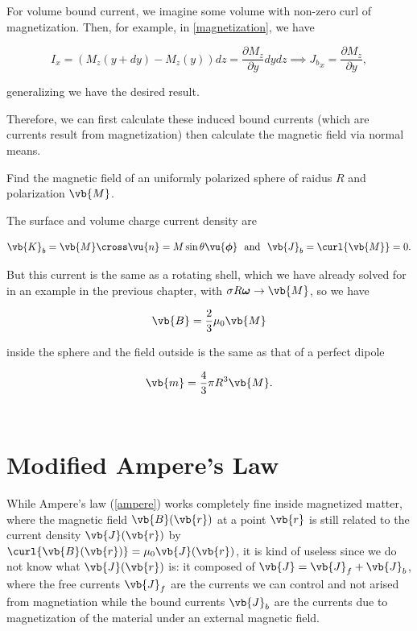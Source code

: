 \documentclass[english,a4paper,12pt]{report}
\begin{document}
For volume bound current, we imagine some volume with non-zero curl of magnetization. Then, for example, in \cref{magnetization}, we have

\begin{equation}
    I_{x} = (M_{z}(y+dy) - M_{z}(y) )dz = \frac{\partial M_{z} }{\partial y}dydz \implies {J_{b}}_{x} = \frac{\partial M_{z} }{\partial y},     
\end{equation}

generalizing we have the desired result.


Therefore, we can first calculate these induced bound currents (which are currents result from magnetization) then calculate the magnetic field via normal means.

{Find the magnetic field of an uniformly polarized sphere of raidus \(R\) and polarization \(\vb{M} \).}
{The surface and volume charge current density are 

\begin{equation}
    \vb{K} _{b} = \vb{M} \cross \vu{n} = M\sin \theta \vu{\boldsymbol{\phi } } ~\text { and }~  \vb{J} _{b} = \curl{\vb{M} } = 0.
\end{equation}

But this current is the same as a rotating shell, which we have already solved for in an example in the previous chapter, with \(\sigma R \boldsymbol{\omega }  \to \vb{M} \), so we have 

\begin{equation}
    \vb{B} = \frac{2}{3}\mu_0 \vb{M}  
\end{equation}

inside the sphere and the field outside is the same as that of a perfect dipole 

\begin{equation}
    \vb{m} = \frac{4}{3} \pi R^3 \vb{M} . 
\end{equation}~
}

\section{Modified Ampere's Law}

While Ampere's law (\cref{ampere}) works completely fine inside magnetized matter, where the magnetic field \(\vb{B} (\vb{r})\) at a point \(\vb{r} \) is still related to the current density \(\vb{J} (\vb{r} )\) by \(\curl{\vb{B} (\vb{r} )} = \mu_0 \vb{J} (\vb{r} ) \), it is kind of useless since we do not know what \(\vb{J} (\vb{r} )\) is: it composed of \(\vb{J} = \vb{J} _{f} + \vb{J} _{b}  \), where the free currents \(\vb{J} _{f} \) are the currents we can control and not arised from magnetiation while the bound currents \(\vb{J} _{b} \) are the currents due to magnetization of the material under an external magnetic field. 
\end{document}
